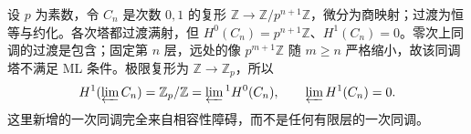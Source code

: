 \begin{example}\label{b4:exm:milnor-nonzero-correction}
	设 \(p\) 为素数，令 \(C_n\) 是次数 \(0,1\) 的复形 \(\mathbb Z\to\mathbb Z/p^{n+1}\mathbb Z\)，微分为商映射；过渡为恒等与约化。各次塔都过渡满射，但 \(H^0(C_n)=p^{n+1}\mathbb Z\)、\(H^1(C_n)=0\)。零次上同调的过渡是包含；固定第 \(n\) 层，远处的像 \(p^{m+1}\mathbb Z\) 随 \(m\ge n\) 严格缩小，故该同调塔不满足 ML 条件。极限复形为 \(\mathbb Z\to\mathbb Z_p\)，所以
	\[
		H^1(\varprojlim C_n)=\mathbb Z_p/\mathbb Z =\varprojlim{}^1H^0(C_n), \qquad \varprojlim H^1(C_n)=0.
	\]
	这里新增的一次同调完全来自相容性障碍，而不是任何有限层的一次同调。
\end{example}
